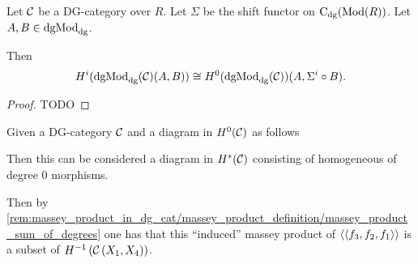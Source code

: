 
\begin{proposition}
    Let \( {\mathcal{C}} \) be a DG-category over \( R \). Let \( \Sigma \) be the shift functor on \( \operatorname{C}_{\operatorname{dg}}(\operatorname{Mod}(R)) \). Let \( A, B \in \operatorname{dgMod}_{\operatorname{dg}} \).

    Then
    \[
        H^i(\operatorname{dgMod}_{\operatorname{dg}}({\mathcal{C}})(A, B)) \cong H^0(\operatorname{dgMod}_{\operatorname{dg}}({\mathcal{C}}))(A, \Sigma^i \circ B).
    \]
\end{proposition}
\begin{proof}
    TODO
\end{proof}

\begin{remark}
    \label{rem:induced_massey_product_on_H-0}
    Given a DG-category \( {\mathcal{C}} \) and a diagram in \( H^0({\mathcal{C}}) \) as follows
    \begin{center}
    \end{center}
    Then this can be considered a diagram in \( H^*({\mathcal{C}}) \) consisting of homogeneous of degree \( 0 \) morphisms.

    Then by \autoref{rem:massey_product_in_dg_cat/massey_product_definition/massey_product_sum_of_degrees} one has that this ``induced'' massey product of \( \langle\langle f_3, f_2, f_1 \rangle\rangle \) is a subset of \( H^{-1} \left( {\mathcal{C}} \left( X_1, X_4 \right) \right) \).
\end{remark}

